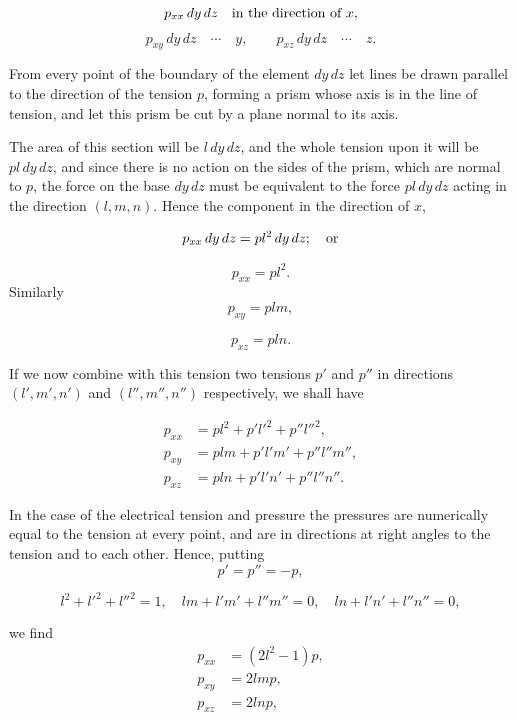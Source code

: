 \documentclass[11pt,a4paper]{article}
\begin{document}
\[
p_{xx}\,dy\,dz\quad\hbox{in the direction of }x,
\]
\[
p_{xy}\,dy\,dz\quad\cdots\quad y,\qquad
p_{xz}\,dy\,dz\quad\cdots\quad z.
\]

From every point of the boundary of the element $dy\,dz$ let lines be drawn parallel to the direction of the tension $p$, forming a prism whose axis is in the line of tension, and let this prism be cut by a plane normal to its axis.

The area of this section will be $l\,dy\,dz$, and the whole tension upon it will be $pl\,dy\,dz$, and since there is no action on the sides of the prism, which are normal to $p$, the force on the base $dy\,dz$ must be equivalent to the force $pl\,dy\,dz$ acting in the direction $(l,m,n)$. Hence the component in the direction of $x$,

\[
p_{xx}\,dy\,dz=pl^2\,dy\,dz;\quad\hbox{or}
\]

\[
p_{xx}=pl^2.
\]
Similarly
\[
p_{xy}=plm,
\]

\[
p_{xz}=pln.
\]

If we now combine with this tension two tensions $p'$ and $p''$ in directions $(l',m',n')$ and $(l'',m'',n'')$ respectively, we shall have

\begin{equation}\tag{2}
\begin{split}
p_{xx}&=pl^{2}+p'l'^{2}+p''l''^{2},\\
p_{xy}&=plm+p'l'm'+p''l''m'',\\
p_{xz}&=pln+p'l'n'+p''l''n''.
\end{split}
\end{equation}

In the case of the electrical tension and pressure the pressures are numerically equal to the tension at every point, and are in directions at right angles to the tension and to each other. Hence, putting
\begin{equation}\tag{3}
p' = p'' = -p,
\end{equation}

\begin{equation}\tag{4}
l^2+l'^2+l''^2=1,\quad
lm+l'm'+l''m''=0,\quad
ln+l'n'+l''n''=0,
\end{equation}

we find
\begin{equation}\tag{5}
\begin{split}
p_{xx}&=(2l^2-1)p,\\
p_{xy}&=2lmp,\\
p_{xz}&=2lnp,
\end{split}
\end{equation}
\end{document}
